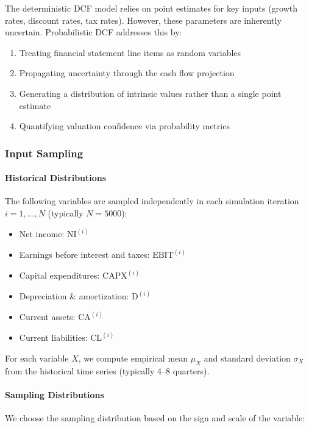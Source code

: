 The deterministic DCF model relies on point estimates for key inputs (growth rates, discount rates, tax rates). However, these parameters are inherently uncertain. Probabilistic DCF addresses this by:

\begin{enumerate}
  \item Treating financial statement line items as random variables
  \item Propagating uncertainty through the cash flow projection
  \item Generating a distribution of intrinsic values rather than a single point estimate
  \item Quantifying valuation confidence via probability metrics
\end{enumerate}

\subsubsection{Input Sampling}

\paragraph{Historical Distributions}

The following variables are sampled independently in each simulation iteration $i = 1, \ldots, N$ (typically $N = 5000$):

\begin{itemize}
  \item Net income: $\text{NI}^{(i)}$
  \item Earnings before interest and taxes: $\text{EBIT}^{(i)}$
  \item Capital expenditures: $\text{CAPX}^{(i)}$
  \item Depreciation \& amortization: $\text{D}^{(i)}$
  \item Current assets: $\text{CA}^{(i)}$
  \item Current liabilities: $\text{CL}^{(i)}$
\end{itemize}

For each variable $X$, we compute empirical mean $\mu_X$ and standard deviation $\sigma_X$ from the historical time series (typically 4--8 quarters).

\paragraph{Sampling Distributions}

We choose the sampling distribution based on the sign and scale of the variable:

